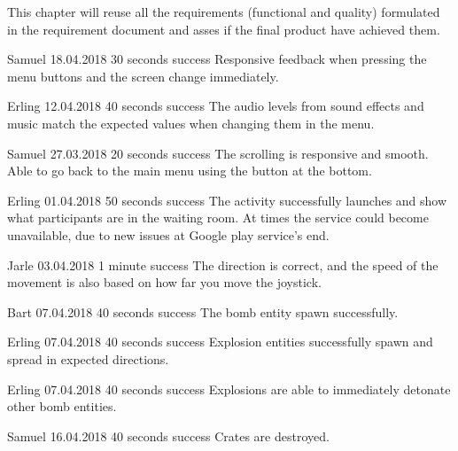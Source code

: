 
This chapter will reuse all the requirements (functional and quality) formulated in the requirement document and asses if the final product have achieved them.

{Samuel}
{18.04.2018}
{30 seconds}
{success}
{Responsive feedback when pressing the menu buttons and the screen change immediately.}

{Erling}
{12.04.2018}
{40 seconds}
{success}
{The audio levels from sound effects and music match the expected values when changing them in the menu.}

{Samuel}
{27.03.2018}
{20 seconds}
{success}
{The scrolling is responsive and smooth. Able to go back to the main menu using the button at the bottom.}

{Erling}
{01.04.2018}
{50 seconds}
{success}
{The activity successfully launches and show what participants are in the waiting room. At times the service could become unavailable, due to new issues at Google play service’s end.}

{Jarle}
{03.04.2018}
{1 minute}
{success}
{The direction is correct, and the speed of the movement is also based on how far you move the joystick.}

{Bart}
{07.04.2018}
{40 seconds}
{success}
{The bomb entity spawn successfully.}

{Erling}
{07.04.2018}
{40 seconds}
{success}
{Explosion entities successfully spawn and spread in expected directions.}

{Erling}
{07.04.2018}
{40 seconds}
{success}
{Explosions are able to immediately detonate other bomb entities.}

{Samuel}
{16.04.2018}
{40 seconds}
{success}
{Crates are destroyed.}


